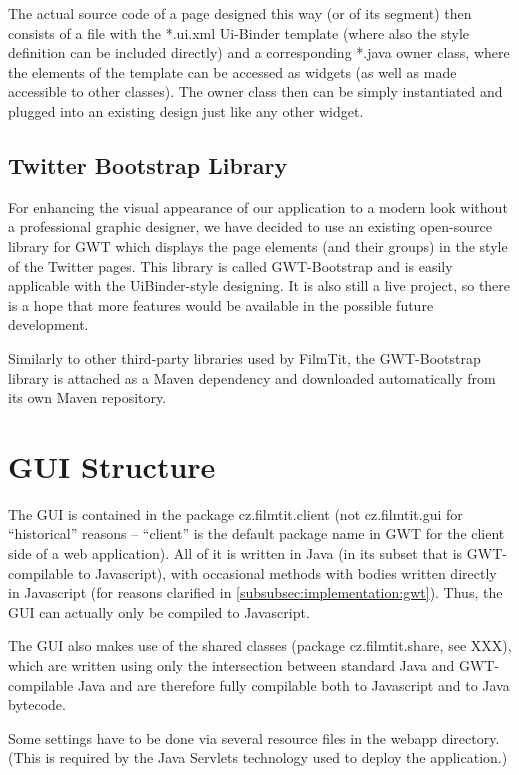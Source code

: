 The actual source code of a page designed this way (or of its segment) then consists of a file with the *.ui.xml Ui-Binder template (where also the style definition can be included directly) and a corresponding *.java owner class, where the elements of the template can be accessed as widgets (as well as made accessible to other classes). The owner class then can be simply instantiated and plugged into an existing design just like any other widget.

\subsection{Twitter Bootstrap Library}
For enhancing the visual appearance of our application to a modern look without a professional graphic designer, we have decided to use an existing open-source library for GWT which displays the page elements (and their groups) in the style of the Twitter pages. This library is called GWT-Bootstrap and is easily applicable with the UiBinder-style designing. It is also still a live project, so there is a hope that more features would be available in the possible future development.

Similarly to other third-party libraries used by FilmTit, the GWT-Bootstrap library is attached as a Maven dependency and downloaded automatically from its own Maven repository.


\section{GUI Structure}

The GUI is contained in the package cz.filmtit.client (not cz.filmtit.gui for ``historical'' reasons -- ``client'' is the default package name in GWT for the client side of a web application). All of it is written in Java (in its subset that is GWT-compilable to Javascript), with occasional methods with bodies written directly in Javascript (for reasons clarified in \ref{subsubsec:implementation:gwt}). Thus, the GUI can actually only be compiled to Javascript.

The GUI also makes use of the shared classes (package cz.filmtit.share, see XXX), which are written using only the intersection between standard Java and GWT-compilable Java and are therefore fully compilable both to Javascript and to Java bytecode.

Some settings have to be done via several resource files in the webapp directory. (This is required by the Java Servlets technology used to deploy the application.)

